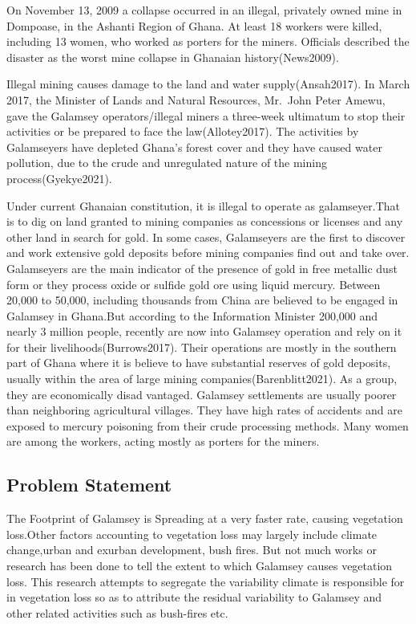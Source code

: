 \documentclass[10pt]{report}
\begin{document}
On November 13, 2009 a collapse occurred in an illegal, privately owned
mine in Dompoase, in the Ashanti Region of Ghana. At least 18 workers
were killed, including 13 women, who worked as porters for the miners.
Officials described the disaster as the worst mine collapse in Ghanaian
history(News2009).

Illegal mining causes damage to the land and water supply(Ansah2017). In
March 2017, the Minister of Lands and Natural Resources, Mr.~John Peter
Amewu, gave the Galamsey operators/illegal miners a three-week ultimatum
to stop their activities or be prepared to face the law(Allotey2017).
The activities by Galamseyers have depleted Ghana's forest cover and
they have caused water pollution, due to the crude and unregulated
nature of the mining process(Gyekye2021).

Under current Ghanaian constitution, it is illegal to operate as
galamseyer.That is to dig on land granted to mining companies as
concessions or licenses and any other land in search for gold. In some
cases, Galamseyers are the first to discover and work extensive gold
deposits before mining companies find out and take over. Galamseyers are
the main indicator of the presence of gold in free metallic dust form or
they process oxide or sulfide gold ore using liquid mercury. Between
20,000 to 50,000, including thousands from China are believed to be
engaged in Galamsey in Ghana.But according to the Information Minister
200,000 and nearly 3 million people, recently are now into Galamsey
operation and rely on it for their livelihoods(Burrows2017). Their
operations are mostly in the southern part of Ghana where it is believe
to have substantial reserves of gold deposits, usually within the area
of large mining companies(Barenblitt2021). As a group, they are
economically disad vantaged. Galamsey settlements are usually poorer
than neighboring agricultural villages. They have high rates of
accidents and are exposed to mercury poisoning from their crude
processing methods. Many women are among the workers, acting mostly as
porters for the miners.

\hypertarget{problem-statement}{%
\subsection{Problem Statement}\label{problem-statement}}

The Footprint of Galamsey is Spreading at a very faster rate, causing
vegetation loss.Other factors accounting to vegetation loss may largely
include climate change,urban and exurban development, bush fires. But
not much works or research has been done to tell the extent to which
Galamsey causes vegetation loss. This research attempts to segregate the
variability climate is responsible for in vegetation loss so as to
attribute the residual variability to Galamsey and other related
activities such as bush-fires etc.
\end{document}
